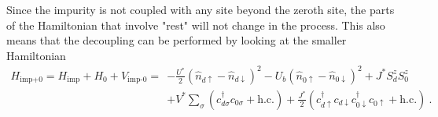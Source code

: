 \documentclass{iopart}
\begin{document}
Since the impurity is not coupled with any site beyond the zeroth site, the parts of the Hamiltonian that involve "rest" will not change in the process. This also means that the decoupling can be performed by looking at the smaller Hamiltonian
\begin{eqnarray}
	H_\text{imp+0} = H_\text{imp} + H_\text{0} + V_\text{imp-0} =& -\frac{U^*}{2}\left( \hat n_{d \uparrow} - \hat n_{d \downarrow} \right)^2 - U_b \left( \hat n_{0 \uparrow} - \hat n_{0 \downarrow} \right)^2 + J^*S_d^z S_0^z\nonumber\\
								    & + {V^*}\sum_\sigma \left(c^\dagger_{d\sigma}c_{0\sigma} + \text{h.c.}\right) + \frac{J^*}{2}\left( c^\dagger_{d \uparrow}c_{d \downarrow} c^\dagger_{0 \downarrow} c_{0 \uparrow} + \text{h.c.} \right)~.
\end{eqnarray}
\end{document}
